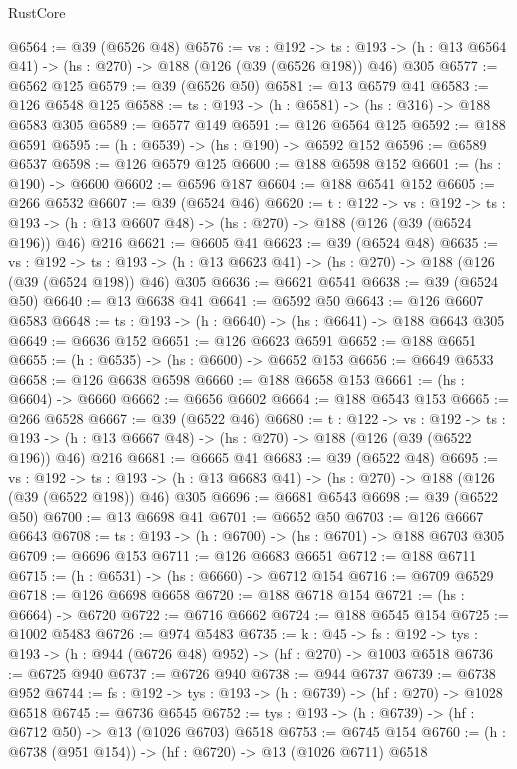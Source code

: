 \begin{lexlean}{RustCore}
\begin{coremodule}
@6564 := @39 (@6526 @48)
@6576 := {vs : @192} ->
  {ts : @193} -> (h : @13 @6564 @41) -> (hs : @270) -> @188 (@126 (@39 (@6526 @198)) @46) @305
@6577 := @6562 @125
@6579 := @39 (@6526 @50)
@6581 := @13 @6579 @41
@6583 := @126 @6548 @125
@6588 := {ts : @193} -> (h : @6581) -> (hs : @316) -> @188 @6583 @305
@6589 := @6577 @149
@6591 := @126 @6564 @125
@6592 := @188 @6591
@6595 := (h : @6539) -> (hs : @190) -> @6592 @152
@6596 := @6589 @6537
@6598 := @126 @6579 @125
@6600 := @188 @6598 @152
@6601 := (hs : @190) -> @6600
@6602 := @6596 @187
@6604 := @188 @6541 @152
@6605 := @266 @6532
@6607 := @39 (@6524 @46)
@6620 := {t : @122} ->
  {vs : @192} ->
  {ts : @193} -> (h : @13 @6607 @48) -> (hs : @270) -> @188 (@126 (@39 (@6524 @196)) @46) @216
@6621 := @6605 @41
@6623 := @39 (@6524 @48)
@6635 := {vs : @192} ->
  {ts : @193} -> (h : @13 @6623 @41) -> (hs : @270) -> @188 (@126 (@39 (@6524 @198)) @46) @305
@6636 := @6621 @6541
@6638 := @39 (@6524 @50)
@6640 := @13 @6638 @41
@6641 := @6592 @50
@6643 := @126 @6607 @6583
@6648 := {ts : @193} -> (h : @6640) -> (hs : @6641) -> @188 @6643 @305
@6649 := @6636 @152
@6651 := @126 @6623 @6591
@6652 := @188 @6651
@6655 := (h : @6535) -> (hs : @6600) -> @6652 @153
@6656 := @6649 @6533
@6658 := @126 @6638 @6598
@6660 := @188 @6658 @153
@6661 := (hs : @6604) -> @6660
@6662 := @6656 @6602
@6664 := @188 @6543 @153
@6665 := @266 @6528
@6667 := @39 (@6522 @46)
@6680 := {t : @122} ->
  {vs : @192} ->
  {ts : @193} -> (h : @13 @6667 @48) -> (hs : @270) -> @188 (@126 (@39 (@6522 @196)) @46) @216
@6681 := @6665 @41
@6683 := @39 (@6522 @48)
@6695 := {vs : @192} ->
  {ts : @193} -> (h : @13 @6683 @41) -> (hs : @270) -> @188 (@126 (@39 (@6522 @198)) @46) @305
@6696 := @6681 @6543
@6698 := @39 (@6522 @50)
@6700 := @13 @6698 @41
@6701 := @6652 @50
@6703 := @126 @6667 @6643
@6708 := {ts : @193} -> (h : @6700) -> (hs : @6701) -> @188 @6703 @305
@6709 := @6696 @153
@6711 := @126 @6683 @6651
@6712 := @188 @6711
@6715 := (h : @6531) -> (hs : @6660) -> @6712 @154
@6716 := @6709 @6529
@6718 := @126 @6698 @6658
@6720 := @188 @6718 @154
@6721 := (hs : @6664) -> @6720
@6722 := @6716 @6662
@6724 := @188 @6545 @154
@6725 := @1002 @5483
@6726 := @974 @5483
@6735 := {k : @45} ->
  {fs : @192} -> {tys : @193} -> (h : @944 (@6726 @48) @952) -> (hf : @270) -> @1003 @6518
@6736 := @6725 @940
@6737 := @6726 @940
@6738 := @944 @6737
@6739 := @6738 @952
@6744 := {fs : @192} -> {tys : @193} -> (h : @6739) -> (hf : @270) -> @1028 @6518
@6745 := @6736 @6545
@6752 := {tys : @193} -> (h : @6739) -> (hf : @6712 @50) -> @13 (@1026 @6703) @6518
@6753 := @6745 @154
@6760 := (h : @6738 (@951 @154)) -> (hf : @6720) -> @13 (@1026 @6711) @6518

\end{coremodule}
\end{lexlean}
